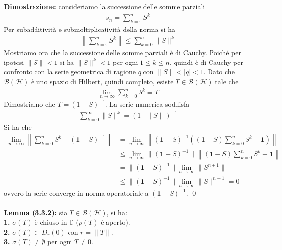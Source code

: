 \documentclass{article}
\numberwithin{equation}{subsection}
\begin{document}
\textbf{Dimostrazione:} consideriamo la successione delle somme parziali 
\begin{align*}
    s_n = \sum_{k = 0}^n S^k 
\end{align*}
Per subadditività e submoltiplicatività della norma si ha 
\begin{align*}
    \left\|\sum_{k = 0}^n S^k\right\| \leq \sum_{k = 0}^n \|S\|^k 
\end{align*}
Mostriamo ora che la successione delle somme parziali è di Cauchy. Poiché per ipotesi $\|S\| < 1$ si ha $\|S\|^k < 1$ per ogni $1 \leq k \leq n$, quindi è di Cauchy per confronto con la serie geometrica di ragione $q$ con $\|S\| < |q| < 1$. Dato che $\mathcal{B}(\mathcal{H})$ è uno spazio di Hilbert, quindi completo, esiste $T \in \mathcal{B}(\mathcal{H})$ tale che 
\begin{align*}
    \lim_{n \rightarrow \infty}\sum_{k = 0}^n S^k = T 
\end{align*}
Dimostriamo che $T = (1 - S)^{-1}$. La serie numerica soddisfa 
\begin{align*}
    \sum_{k = 0}^\infty \|S\|^k = (1 - \|S\|)^{-1} 
\end{align*}
Si ha che 
\begin{align*}
    \lim_{n \rightarrow \infty}\left\|\sum_{k = 0}^n S^k - (\mathbf{1} - S)^{-1}\right\| &= \lim_{n \rightarrow \infty}\left\|(\mathbf{1} - S)^{-1}\left((\mathbf{1} - S)\sum_{k = 0}^nS^k - \mathbf{1}\right)\right\|  \\
    &\leq \lim_{n \rightarrow \infty}\|(\mathbf{1} - S)^{-1}\|\left\|(\mathbf{1} - S)\sum_{k = 0}^n S^k - \mathbf{1}\right\|  \\
    &= \|(\mathbf{1} - S)^{-1}\|\lim_{n \rightarrow \infty}\|S^{n + 1}\|  \\
    &\leq \|(\mathbf{1} - S)^{-1}\|\lim_{n \rightarrow \infty}\|S\|^{n + 1} = 0 
\end{align*}
ovvero la serie converge in norma operatoriale a $(\mathbf{1} - S)^{-1}$. \qed \\ \\
\textbf{Lemma (3.3.2):} sia $T \in \mathcal{B}(\mathcal{H})$, si ha: \\
\textbf{1.} $\sigma(T)$ è chiuso in $\mathbb{C}$ ($\rho(T)$ è aperto). \\
\textbf{2.} $\sigma(T) \subset D_r(0)$ con $r = \|T\|$. \\
\textbf{3.} $\sigma(T) \neq \emptyset$ per ogni $T \neq 0$. \\
\end{document}
